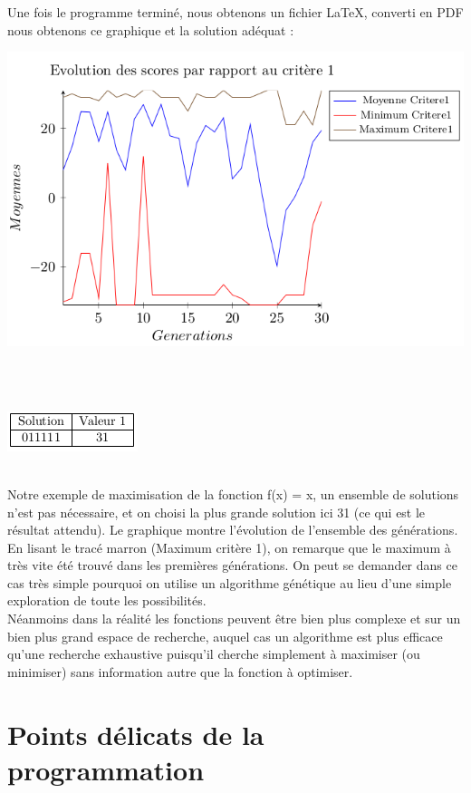 \documentclass[a4paper,11pt]{article}
\begin{document}
			Une fois le programme terminé, nous obtenons un fichier LaTeX, converti en PDF nous obtenons ce graphique et la solution adéquat :\\
			\centerline{\includegraphics[scale=0.5]{Graphe.png}}\\\\
			\centerline{\includegraphics[scale=0.5]{Resultats.png}}\\
			
			Notre exemple de maximisation de la fonction f(x) = x, un ensemble de solutions n’est pas nécessaire, et on choisi la plus grande solution ici 31 (ce qui est le résultat attendu).
			Le graphique montre l’évolution de l’ensemble des générations.
			En lisant le tracé marron (Maximum critère 1), on remarque que le maximum à très vite été trouvé dans les premières générations.
			On peut se demander dans ce cas très simple pourquoi on utilise un algorithme génétique au lieu d’une simple exploration de toute les possibilités.\\
			Néanmoins dans la réalité les fonctions peuvent être bien plus complexe et sur un bien plus grand espace de recherche, auquel cas un algorithme est plus efficace qu’une recherche exhaustive puisqu’il cherche simplement à maximiser (ou minimiser) sans information autre que la fonction à optimiser.
		
		
		\section{Points délicats de la programmation}
\end{document}
